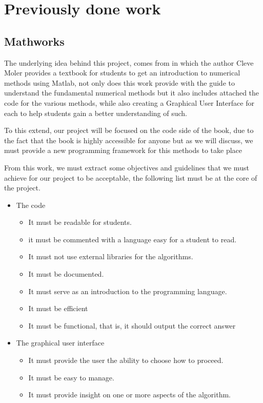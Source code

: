 \chapter{Previously done work}
\section{Mathworks}
The underlying idea behind this project, comes from \cite{doi:10.1137/1.9780898717952} in which the author Cleve Moler provides a textbook for students to get an introduction to numerical methods using Matlab, not only does this work provide with the guide to understand the fundamental numerical methods but it also includes attached the code for the various methods, while also creating a Graphical User Interface for each to help students gain a better understanding of such.

To this extend, our project will be focused on the code side of the book, due to the fact that the book is highly accessible for anyone but as we will discuss, we must provide a new programming framework for this methods to take place

From this work, we must extract some objectives and guidelines that we must achieve for our project to be acceptable, the following list must be at the core of the project.

\begin{itemize}
\item The code
    \begin{itemize}
        \item It must be readable for students.
        \item it must be commented with a language easy for a student to read.
        \item It must not use external libraries for the algorithms.
        \item It must be documented.
        \item It must serve as an introduction to the programming language.
        \item It must be efficient
        \item It must be functional, that is, it should output the correct answer
    \end{itemize}
\item The graphical user interface
    \begin{itemize}
        \item It must provide the user the ability to choose how to proceed.
        \item It must be easy to manage.
        \item It must provide insight on one or more aspects of the algorithm.
    \end{itemize}
\end{itemize}

